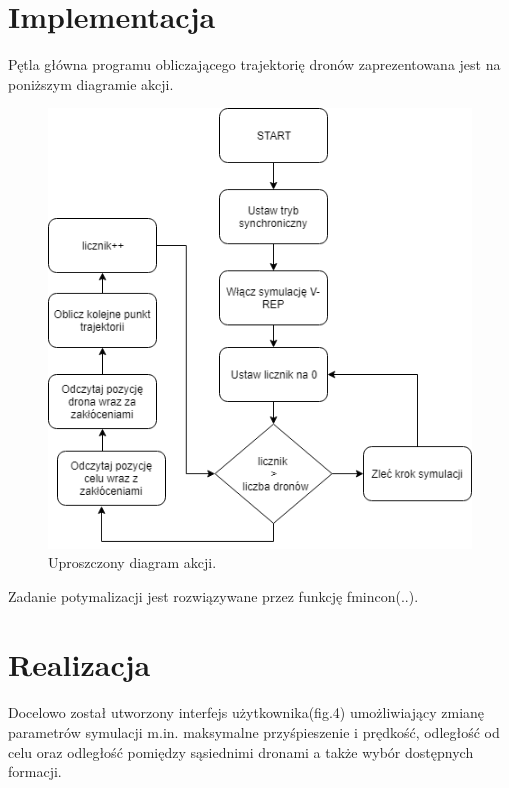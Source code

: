 \documentclass[a4paper, 11pt, oneside]{article}
\begin{document}
\section{Implementacja}
Pętla główna programu obliczającego trajektorię dronów zaprezentowana jest na poniższym diagramie akcji.
\begin{figure}[H]
\centering
\includegraphics[scale=0.5]{uproszczony_digram_akcji.png}
\caption{Uproszczony diagram akcji.}

\end{figure}
Zadanie potymalizacji jest rozwiązywane przez funkcję fmincon(..).
\newpage
\section{Realizacja}
Docelowo został utworzony interfejs użytkownika(fig.4) umożliwiający zmianę parametrów symulacji m.in. maksymalne przyśpieszenie i prędkość, odległość od celu oraz odległość pomiędzy sąsiednimi dronami a także wybór dostępnych formacji.
\end{document}
